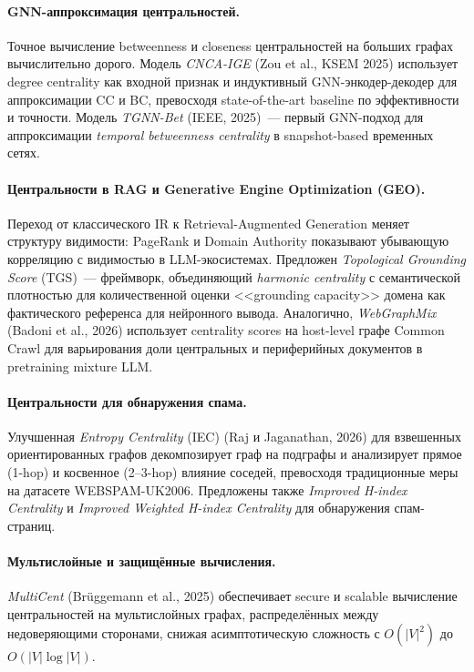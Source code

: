 \documentclass[12pt, a4paper]{article}
\begin{document}
\paragraph{GNN-аппроксимация центральностей.}
Точное вычисление betweenness и closeness центральностей на больших графах вычислительно дорого. Модель \emph{CNCA-IGE} (Zou et al., KSEM 2025) использует degree centrality как входной признак и индуктивный GNN-энкодер-декодер для аппроксимации CC и BC, превосходя state-of-the-art baseline по эффективности и точности. Модель \emph{TGNN-Bet} (IEEE, 2025)~--- первый GNN-подход для аппроксимации \emph{temporal betweenness centrality} в snapshot-based временных сетях.

\paragraph{Центральности в RAG и Generative Engine Optimization (GEO).}
Переход от классического IR к Retrieval-Augmented Generation меняет структуру видимости: PageRank и Domain Authority показывают убывающую корреляцию с видимостью в LLM-экосистемах. Предложен \emph{Topological Grounding Score} (TGS)~--- фреймворк, объединяющий \emph{harmonic centrality} с семантической плотностью для количественной оценки <<grounding capacity>> домена как фактического референса для нейронного вывода. Аналогично, \emph{WebGraphMix} (Badoni et al., 2026) использует centrality scores на host-level графе Common Crawl для варьирования доли центральных и периферийных документов в pretraining mixture LLM.

\paragraph{Центральности для обнаружения спама.}
Улучшенная \emph{Entropy Centrality} (IEC) (Raj и Jaganathan, 2026) для взвешенных ориентированных графов декомпозирует граф на подграфы и анализирует прямое (1-hop) и косвенное (2--3-hop) влияние соседей, превосходя традиционные меры на датасете WEBSPAM-UK2006. Предложены также \emph{Improved H-index Centrality} и \emph{Improved Weighted H-index Centrality} для обнаружения спам-страниц.

\paragraph{Мультислойные и защищённые вычисления.}
\emph{MultiCent} (Br\"uggemann et al., 2025) обеспечивает secure и scalable вычисление центральностей на мультислойных графах, распределённых между недоверяющими сторонами, снижая асимптотическую сложность с $O(|V|^2)$ до $O(|V| \log |V|)$.
\end{document}
